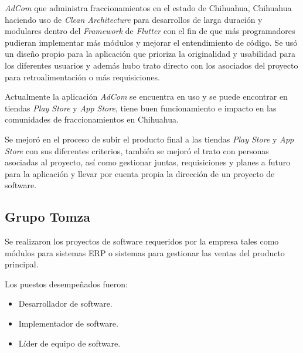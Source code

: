 \documentclass[protocolo.tex]{subfiles}
\begin{document}
\begin{enumerate}
\textit{AdCom} que administra fraccionamientos en el estado de Chihuahua,
Chihuahua haciendo uso de \textit{Clean Architecture} para desarrollos de larga duración y modulares
dentro del \textit{Framework} de \textit{Flutter} con el fin de que más programadores pudieran
implementar más módulos y mejorar el entendimiento de código. Se usó un diseño propio
para la aplicación que prioriza la originalidad y usabilidad para los diferentes usuarios y además hubo
trato directo con los asociados del proyecto para retroalimentación o más requisiciones.


Actualmente la aplicación \textit{AdCom} se encuentra en uso y se puede encontrar en tiendas \textit{Play
Store} y \textit{App Store}, tiene buen funcionamiento e impacto en las comunidades de
fraccionamientos en Chihuahua.

Se mejoró en el proceso de subir el producto final a las tiendas \textit{Play Store} y \textit{App Store} con
sus diferentes criterios, también se mejoró el trato con personas asociadas al proyecto, así como
gestionar juntas, requisiciones y planes a futuro para la aplicación y llevar por cuenta propia la dirección de un proyecto de software.

\end{enumerate}


\subsection{Grupo Tomza}

Se realizaron los proyectos de software requeridos por la empresa tales como módulos para
sistemas ERP o sistemas para gestionar las ventas del producto principal.\vspace{5mm}

Los puestos desempeñados fueron:

\begin{itemize}
\item Desarrollador de software.
\item Implementador de software.
\item Líder de equipo de software.
\end{itemize}
\end{document}
